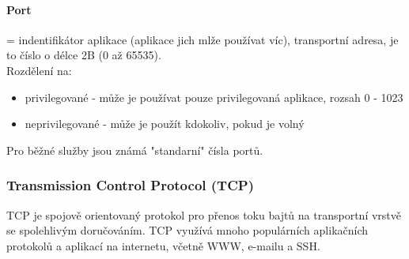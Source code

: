 \documentclass[10pt,a4paper]{article}
\begin{document}
\paragraph{Port} = indentifikátor aplikace (aplikace jich mlže používat víc), transportní adresa, je to číslo o délce 2B (0 až 65535). \\
Rozdělení na:
\begin{itemize}
	\item privilegované - může je používat pouze privilegovaná aplikace, rozsah 0 - 1023
	\item neprivilegované - může je použít kdokoliv, pokud je volný
\end{itemize}
Pro běžné služby jsou známá "standarní" čísla portů.

\subsubsection{Transmission Control Protocol (TCP)}
TCP je spojově orientovaný protokol pro přenos toku bajtů na transportní vrstvě se spolehlivým doručováním. TCP využívá mnoho populárních aplikačních protokolů a aplikací na internetu, včetně WWW, e-mailu a SSH.
\end{document}
